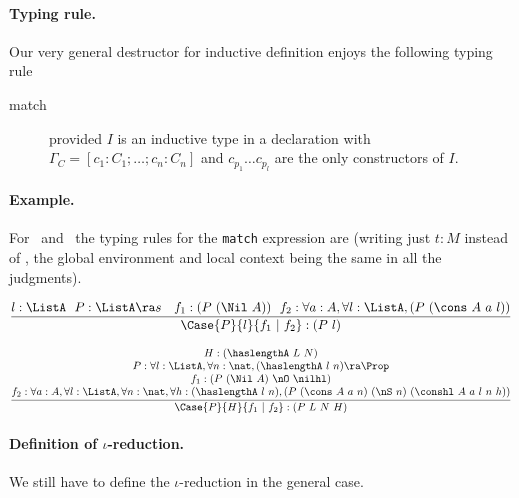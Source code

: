 \paragraph{Typing rule.}

Our very general destructor for inductive definition enjoys the
following typing rule

\begin{description}
\item[match] \label{elimdep} 

provided $I$ is an inductive type in a declaration
 with 
$\Gamma_C = [c_1:C_1;\ldots;c_n:C_n]$ and $c_{p_1}\ldots  c_{p_l}$ are the
only constructors of $I$.
\end{description}

\paragraph{Example.}
For \List\ and \haslength\ the typing rules for the {\tt match} expression
are (writing just $t:M$ instead of , the global environment and
local context being the same in all the judgments).

\[\frac{l:\ListA~~P:\ListA\ra s~~~f_1:(P~(\Nil~A))~~
      f_2:\forall a:A, \forall l:\ListA, (P~(\cons~A~a~l))}
    {\Case{P}{l}{f_1~|~f_2}:(P~l)}\]

\[\frac{
     \begin{array}[b]{@{}c@{}} 
H:(\haslengthA~L~N) \\ P:\forall l:\ListA, \forall n:\nat, (\haslengthA~l~n)\ra
  \Prop\\
 f_1:(P~(\Nil~A)~\nO~\nilhl) \\
   f_2:\forall a:A, \forall l:\ListA, \forall n:\nat, \forall
  h:(\haslengthA~l~n), (P~(\cons~A~a~n)~(\nS~n)~(\conshl~A~a~l~n~h)) 
      \end{array}}
    {\Case{P}{H}{f_1~|~f_2}:(P~L~N~H)}\]

\paragraph[Definition of $\iota$-reduction.]{Definition of $\iota$-reduction.\label{iotared}
}
We still have to define the $\iota$-reduction in the general case.

